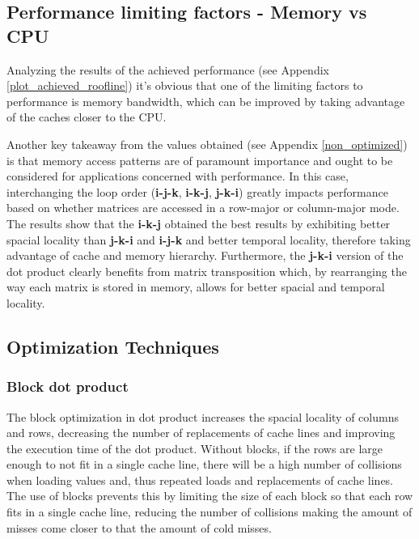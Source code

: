 \documentclass{article}
\begin{document}
\subsection{Performance limiting factors - Memory vs CPU}
Analyzing the results of the achieved performance (see Appendix \ref{plot_achieved_roofline}) it's obvious that one of the limiting factors to performance is memory
bandwidth, which can be improved by taking advantage of the caches closer to the CPU.

Another key takeaway from the values obtained (see Appendix \ref{non_optimized}) is that memory access patterns are of paramount importance and ought to be considered 
for applications concerned with performance. In this case, interchanging the loop order (\textbf{i-j-k}, \textbf{i-k-j}, \textbf{j-k-i}) greatly impacts performance based on whether matrices
are accessed in a row-major or column-major mode. The results show that the \textbf{i-k-j} obtained the best results by 
exhibiting better spacial locality than \textbf{j-k-i} and \textbf{i-j-k} and better temporal locality, therefore taking advantage of cache and memory hierarchy.
Furthermore, the \textbf{j-k-i} version of the dot product clearly benefits from matrix transposition which, by rearranging the way each matrix is stored in memory, allows for
better spacial and temporal locality.

\subsection{Optimization Techniques}
\subsubsection{Block dot product}
The block optimization in dot product increases the spacial locality of columns and rows, decreasing the number of  replacements of 
cache lines and improving the execution time of the dot product. Without blocks, if the rows are large enough to not fit in a single cache 
line, there will be a high number of collisions when loading values and, thus repeated loads and replacements of cache lines. The use of blocks 
prevents this by limiting the size of each block so that each row fits in a single cache line, reducing the number of collisions making the 
amount of misses come closer to that the amount of cold misses. 
\end{document}
